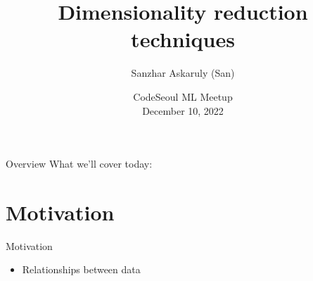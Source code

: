 \documentclass{beamer}
\title[CodeSeoul] %
  {Dimensionality reduction techniques}
\author[AI Research Paper Review] %
  {Sanzhar Askaruly (San)}
\institute[] %
  { Ulsan National Institute of Science and Technology\newline
    Ph.D. Candidate in Biomedical Engineering}
\date[December 10]
{CodeSeoul ML Meetup \\December 10, 2022}
\begin{document}
    \begin{frame}
    \titlepage %
    \end{frame}


    \begin{frame}{Overview}
      What we'll cover today:
      \tableofcontents
    \end{frame}
    
    \section{Motivation} %
    \begin{frame}{Motivation}
        \begin{itemize}
            \item Relationships between data
        \end{itemize}
    \end{frame}
\end{document}
